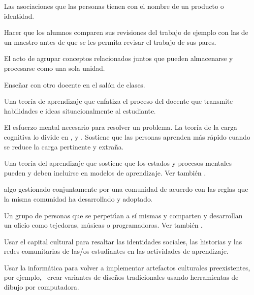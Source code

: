 \begin{description}
 Las asociaciones que las personas tienen con el nombre de un producto o
identidad.

 Hacer que los alumnos comparen sus 
revisiones del trabajo de ejemplo con las de un maestro antes de que 
se les permita revisar el trabajo de sus pares.

 El acto de agrupar conceptos relacionados juntos
que pueden almacenarse y procesarse como una sola unidad.

 Enseñar con otro docente en el
salón de clases.

 Una teoría de
aprendizaje que enfatiza el proceso del docente que transmite habilidades e ideas
situacionalmente al estudiante.

 El esfuerzo mental necesario para resolver un problema.
La teoría de la carga cognitiva lo divide en
 ,
y .
Sostiene que las personas aprenden más rápido cuando se reduce la carga pertinente y extraña.

 Una teoría del aprendizaje que sostiene que los estados 
y procesos mentales pueden y deben incluirse en modelos de aprendizaje. Ver también
.

 algo gestionado conjuntamente por una comunidad 
de acuerdo con las reglas que la misma comunidad ha desarrollado y adoptado.

 Un grupo de personas que se perpetúan a sí mismas 
y comparten y desarrollan un oficio como tejedoras, músicas o programadoras. Ver también
.

 Usar el capital cultural 
para resaltar las identidades sociales, las historias y las redes comunitarias de 
las/os estudiantes en las actividades de aprendizaje.

 Usar la informática 
para volver a implementar artefactos culturales preexistentes, por ejemplo, 
\ crear variantes de diseños tradicionales usando herramientas de dibujo por computadora.



\end{description}
